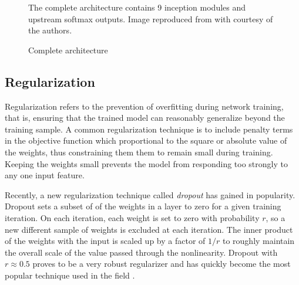 \begin{figure}
\begin{center}
  \end{center}
  \caption{Complete \googlenet architecture}{
  The complete \googlenet architecture contains 9 inception modules and upstream softmax outputs.
  Image reproduced from \cite{szegedy2014going} with courtesy of the authors.}
  \label{googlenet}
\end{figure}

\subsection{Regularization}
\label{regularization_section}

Regularization refers to the prevention of overfitting during network training, that is, ensuring that the trained model can reasonably generalize beyond the training sample.
A common regularization technique is to include penalty terms in the objective function which proportional to the square or absolute value of the weights, thus constraining them them to remain small during training.
Keeping the weights small prevents the model from responding too strongly to any one input feature.

Recently, a new regularization technique called \textit{dropout} \cite{hinton2014dropout} has gained in popularity.
Dropout sets a subset of of the weights in a layer to zero for a given training iteration.  On each iteration, each weight is set to zero with probability $r$, so a new different sample of weights is excluded at each iteration.
The inner product of the weights with the input is scaled up by a factor of $1/r$ to roughly maintain the overall scale of the value passed through the nonlinearity.
Dropout with $r\approx 0.5$ proves to be a very robust regularizer and has quickly become the most popular technique used in the field \cite{lecun2015deep}.


